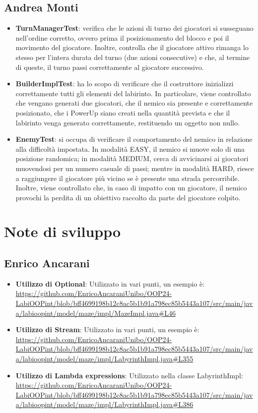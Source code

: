 \documentclass[a4paper,12pt]{report}
\begin{document}
\newpage
\subsection{Andrea Monti}
\begin{itemize}
	\item \textbf{TurnManagerTest}: verifica che le azioni di turno dei giocatori si susseguano nell’ordine corretto, 
	ovvero prima il posizionamento del blocco e poi il movimento del giocatore. 
	Inoltre, controlla che il giocatore attivo rimanga lo stesso per l’intera durata del turno (due azioni consecutive) e 
	che, al termine di queste, il turno passi correttamente al giocatore successivo.
	\item \textbf{BuilderImplTest}: ha lo scopo di verificare che il costruttore inizializzi correttamente 
	tutti gli elementi del labirinto. In particolare, viene controllato che vengano generati due giocatori, che il nemico 
	sia presente e correttamente posizionato, che i PowerUp siano creati nella quantità prevista e che il labirinto venga 
	generato correttamente, restituendo un oggetto non nullo.
	\item \textbf{EnemyTest}: si occupa di verificare il comportamento del nemico in relazione alla difficoltà impostata. In modalità
	EASY, il nemico si muove solo di una posizione randomica; in modalità MEDIUM, cerca di avvicinarsi ai 
	giocatori muovendosi per un numero casuale di passi; mentre in modalità HARD, riesce a raggiungere il giocatore più vicino se è 
	presente una strada percorribile. Inoltre, viene controllato che, in caso di impatto con un giocatore, il nemico provochi 
	la perdita di un obiettivo raccolto da parte del giocatore colpito.
\end{itemize}

\section{Note di sviluppo}

\subsection{Enrico Ancarani}
\begin{itemize}
	\item \textbf{Utilizzo di Optional}: Utilizzato in vari punti, un esempio è: \url{https://github.com/EnricoAncaraniUnibo/OOP24-LabiOOPint/blob/bff4699198b12c8ac5b1b91a798ec85b5443a107/src/main/java/labioopint/model/maze/impl/MazeImpl.java#L46}
	\item \textbf{Utilizzo di Stream}: Utilizzato in vari punti, un esempio è: \url{https://github.com/EnricoAncaraniUnibo/OOP24-LabiOOPint/blob/bff4699198b12c8ac5b1b91a798ec85b5443a107/src/main/java/labioopint/model/maze/impl/LabyrinthImpl.java#L355}
	\item \textbf{Utilizzo di Lambda expressions}: Utilizzato nella classe LabyrinthImpl: \url{https://github.com/EnricoAncaraniUnibo/OOP24-LabiOOPint/blob/bff4699198b12c8ac5b1b91a798ec85b5443a107/src/main/java/labioopint/model/maze/impl/LabyrinthImpl.java#L386}
\end{itemize}
\end{document}
